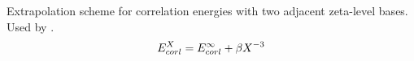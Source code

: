 \documentclass[letterpaper,10pt,english]{sphinxmanual}
\begin{document}

\begin{fulllineitems}
\label{cbs:wrappers.corl_xtpl_helgaker_2}
Extrapolation scheme for correlation energies with two adjacent zeta-level bases.
Used by {\hyperref[cbs:wrappers.complete_basis_set]{}}.
\begin{gather}
\begin{split}E_{corl}^X = E_{corl}^{\infty} + \beta X^{-3}\end{split}\notag\\\begin{split}\end{split}\notag
\end{gather}
\end{fulllineitems}
\end{document}

